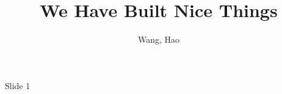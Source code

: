 \documentclass{beamer}
\title{We Have Built Nice Things}
\author{Wang, Hao}
\institute{Lead Engineer @ SunCloud}
\date{}
\begin{document}

\begin{frame}

	\titlepage

\end{frame}




\begin{frame}{Slide 1}


\end{frame}
\end{document}
